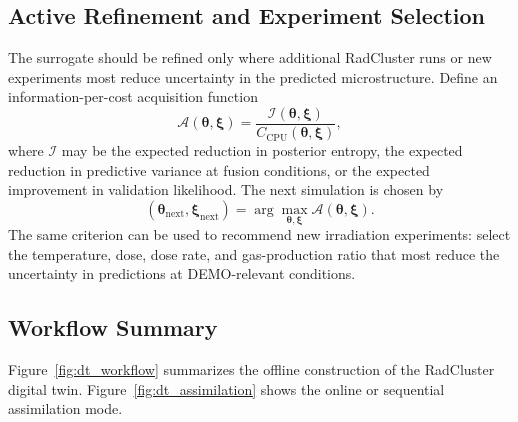 \subsection{Active Refinement and Experiment Selection}
\label{app:dt_active_refinement}

The surrogate should be refined only where additional RadCluster runs or new
experiments most reduce uncertainty in the predicted microstructure.  Define
an information-per-cost acquisition function
\begin{equation}
    \mathcal{A}(\boldsymbol{\theta},\boldsymbol{\xi})
    =
    \frac{
      \mathcal{I}(\boldsymbol{\theta},\boldsymbol{\xi})
    }{
      C_{\mathrm{CPU}}(\boldsymbol{\theta},\boldsymbol{\xi})
    },
\end{equation}
where $\mathcal{I}$ may be the expected reduction in posterior entropy, the
expected reduction in predictive variance at fusion conditions, or the expected
improvement in validation likelihood.  The next simulation is chosen by
\begin{equation}
    (\boldsymbol{\theta}_{\mathrm{next}},\boldsymbol{\xi}_{\mathrm{next}})
    =
    \arg\max_{\boldsymbol{\theta},\boldsymbol{\xi}}
    \mathcal{A}(\boldsymbol{\theta},\boldsymbol{\xi}) .
\end{equation}
The same criterion can be used to recommend new irradiation experiments:
select the temperature, dose, dose rate, and gas-production ratio that most
reduce the uncertainty in predictions at DEMO-relevant conditions.

\subsection{Workflow Summary}
\label{app:dt_workflow_summary}

Figure~\ref{fig:dt_workflow} summarizes the offline construction of the
RadCluster digital twin.  Figure~\ref{fig:dt_assimilation} shows the online or
sequential assimilation mode.

